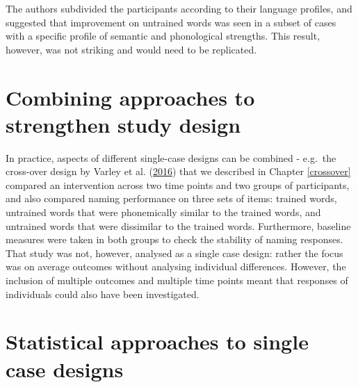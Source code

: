 \documentclass{krantz}
\begin{document}
The authors subdivided the participants according to their language profiles, and suggested that improvement on untrained words was seen in a subset of cases with a specific profile of semantic and phonological strengths. This result, however, was not striking and would need to be replicated.

\hypertarget{combining-approaches-to-strengthen-study-design}{%
\section{Combining approaches to strengthen study design}\label{combining-approaches-to-strengthen-study-design}}

In practice, aspects of different single-case designs can be combined - e.g.~the cross-over design by Varley et al. (\protect\hyperlink{ref-varley2016}{2016}) that we described in Chapter \ref{crossover} compared an intervention across two time points and two groups of participants, and also compared naming performance on three sets of items: trained words, untrained words that were phonemically similar to the trained words, and untrained words that were dissimilar to the trained words. Furthermore, baseline measures were taken in both groups to check the stability of naming responses. That study was not, however, analysed as a single case design: rather the focus was on average outcomes without analysing individual differences. However, the inclusion of multiple outcomes and multiple time points meant that responses of individuals could also have been investigated.

\hypertarget{statistical-approaches-to-single-case-designs}{%
\section{Statistical approaches to single case designs}\label{statistical-approaches-to-single-case-designs}}
\end{document}
